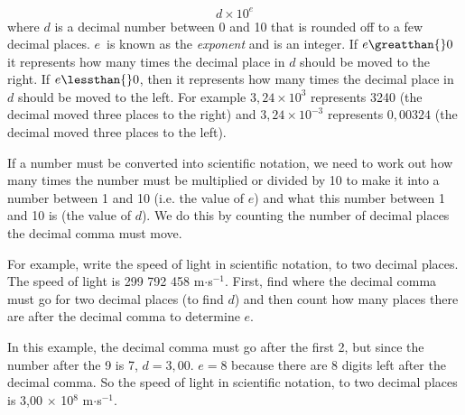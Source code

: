     \begin{equation}
    d\ensuremath{\times}{10}^{e}\tag{5}
      \end{equation}
        \label{m30853*id64634}where $d$ is a decimal number between 0 and 10 that is rounded off to a few decimal places. $e$~is known as the \textsl{exponent} and is an integer.
If $e\greatthan{}0$ it represents how many times the decimal place in $d$ should be moved to the right. If $e\lessthan{}0$, then it represents how many times the decimal place in $d$ should be moved to the left. For example $3,24\ensuremath{\times}{10}^{3}$ represents 3240 (the decimal moved three places to the right) and $3,24\ensuremath{\times}{10}^{-3}$ represents $0,00324$ (the decimal moved three places to the left).\par 
        \label{m30853*id64777}If a number must be converted into scientific notation, we need to work out how many times the number must be multiplied or divided by 10 to make it into a number between 1 and 10 (i.e. the value of $e$) and what this number between 1 and 10 is (the value of $d$). We do this by counting the number of decimal places the decimal comma must move.\par 
        \label{m30853*id64801}For example, write the speed of light in scientific notation, to two decimal places. The speed of light is 299 792 458 m$\ensuremath{\cdot}$s${}^{-1}$. First, find where the decimal comma must go for two decimal places (to find $d$) and then count how many places there are after the decimal comma to determine $e$.\par 
        \label{m30853*id64849}In this example, the decimal comma must go after the first 2, but since the number after the 9 is 7, $d=3,00$. $e=8$ because there are 8 digits left after the decimal comma. So the speed of light in scientific notation, to two decimal places is 3,00 $\ensuremath{\times}$ 10${}^{8}$ m$\ensuremath{\cdot}$s${}^{-1}$.\par 
      \label{m30853*uid19}
